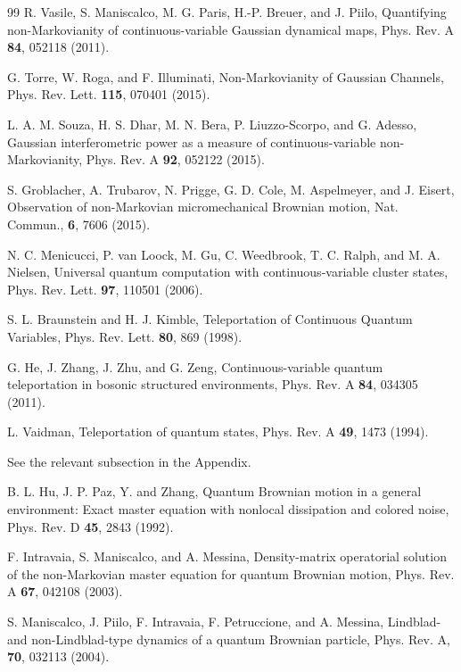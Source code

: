 \documentclass[prl,twocolumn,aps,floatfix,showpacs,tightenlines,superscriptaddress,amsmath,amssymb,amsfonts,10pt]{revtex4-1}
\begin{document}
\begin{thebibliography}{99}
R. Vasile, S. Maniscalco, M. G. Paris, H.-P. Breuer, and J. Piilo, Quantifying non-Markovianity of continuous-variable Gaussian dynamical maps, Phys. Rev. A {\bf 84}, 052118 (2011).

G. Torre, W. Roga, and F. Illuminati, Non-Markovianity of Gaussian Channels, Phys. Rev. Lett. {\bf 115}, 070401 (2015).

L. A. M. Souza, H. S. Dhar, M. N. Bera, P. Liuzzo-Scorpo, and G. Adesso, Gaussian interferometric power as a measure of continuous-variable non-Markovianity, Phys. Rev. A {\bf 92}, 052122 (2015).

S. Groblacher, A. Trubarov, N. Prigge, G. D. Cole, M. Aspelmeyer, and J. Eisert, Observation of non-Markovian micromechanical Brownian motion, Nat. Commun., {\bf 6}, 7606 (2015).

N. C. Menicucci, P. van Loock, M. Gu, C. Weedbrook, T. C. Ralph, and M. A. Nielsen, Universal quantum computation with continuous-variable cluster states, Phys. Rev. Lett. {\bf 97}, 110501 (2006).

S. L. Braunstein and H. J. Kimble, Teleportation of Continuous Quantum Variables, Phys. Rev. Lett. {\bf 80}, 869 (1998).

G. He, J. Zhang, J. Zhu, and G. Zeng, Continuous-variable quantum teleportation in bosonic structured environments, Phys. Rev. A {\bf 84}, 034305 (2011).

L. Vaidman, Teleportation of quantum states, Phys. Rev. A {\bf 49}, 1473 (1994).

See the relevant subsection in the Appendix.

B. L. Hu, J. P. Paz, Y. and Zhang, Quantum Brownian motion in a general environment: Exact master equation with nonlocal dissipation and colored noise, Phys. Rev. D {\bf 45}, 2843 (1992).

F. Intravaia, S. Maniscalco, and A. Messina, Density-matrix operatorial solution of the non-Markovian master equation for quantum Brownian motion, Phys. Rev. A {\bf 67}, 042108 (2003).

S. Maniscalco, J. Piilo, F. Intravaia, F. Petruccione, and A. Messina, Lindblad- and non-Lindblad-type dynamics of a quantum Brownian particle, Phys. Rev. A, {\bf 70}, 032113 (2004).


\end{thebibliography}
\end{document}
